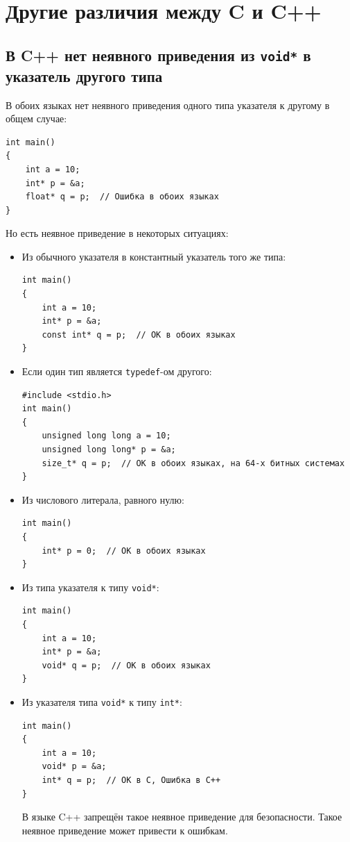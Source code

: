 \documentclass{article}
\begin{document}
\newpage
\section*{Другие различия между C и C++}
\subsection*{В C++ нет неявного приведения из \texttt{void*} в указатель другого типа}
В обоих языках нет неявного приведения одного типа указателя к другому в общем случае:
\begin{lstlisting}
int main()
{
    int a = 10;
    int* p = &a;
    float* q = p;  // Ошибка в обоих языках
}
\end{lstlisting}
Но есть неявное приведение в некоторых ситуациях:

\begin{itemize}
\item Из обычного указателя в константный указатель того же типа:
\begin{lstlisting}
int main()
{
    int a = 10;
    int* p = &a;
    const int* q = p;  // OK в обоих языках
}
\end{lstlisting}

\item Если один тип является \texttt{typedef}-ом другого:
\begin{lstlisting}
#include <stdio.h>
int main()
{
    unsigned long long a = 10;
    unsigned long long* p = &a;
    size_t* q = p;  // OK в обоих языках, на 64-х битных системах
}
\end{lstlisting}

\item Из числового литерала, равного нулю:
\begin{lstlisting}
int main()
{
    int* p = 0;  // OK в обоих языках
}
\end{lstlisting}

\item Из типа указателя к типу \texttt{void*}:
\begin{lstlisting}
int main()
{
    int a = 10;
    int* p = &a;
    void* q = p;  // OK в обоих языках
}
\end{lstlisting}


\item Из указателя типа \texttt{void*} к типу \texttt{int*}:
\begin{lstlisting}
int main()
{
    int a = 10;
    void* p = &a;
    int* q = p;  // OK в C, Ошибка в C++
}
\end{lstlisting}
В языке C++ запрещён такое неявное приведение для безопасности. Такое неявное приведение может привести к ошибкам.

\end{itemize}
\end{document}
